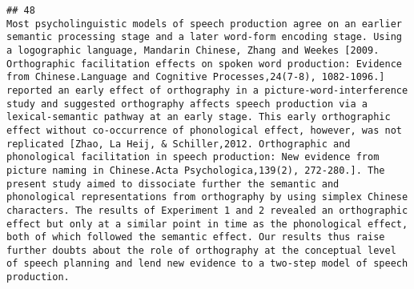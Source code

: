 \documentclass[
  english,
  man]{apa6}
\begin{document}
\begin{verbatim}
## 48                                                                                                                                                                                                                                                                                                                                                                                                                                                                                                                                                                                                                                                                                                                                                                                                                                                                                                                                                                                                                                                                                                                                                                                                                                                                                                                      Most psycholinguistic models of speech production agree on an earlier semantic processing stage and a later word-form encoding stage. Using a logographic language, Mandarin Chinese, Zhang and Weekes [2009. Orthographic facilitation effects on spoken word production: Evidence from Chinese.Language and Cognitive Processes,24(7-8), 1082-1096.] reported an early effect of orthography in a picture-word-interference study and suggested orthography affects speech production via a lexical-semantic pathway at an early stage. This early orthographic effect without co-occurrence of phonological effect, however, was not replicated [Zhao, La Heij, & Schiller,2012. Orthographic and phonological facilitation in speech production: New evidence from picture naming in Chinese.Acta Psychologica,139(2), 272-280.]. The present study aimed to dissociate further the semantic and phonological representations from orthography by using simplex Chinese characters. The results of Experiment 1 and 2 revealed an orthographic effect but only at a similar point in time as the phonological effect, both of which followed the semantic effect. Our results thus raise further doubts about the role of orthography at the conceptual level of speech planning and lend new evidence to a two-step model of speech production.

\end{verbatim}
\end{document}
